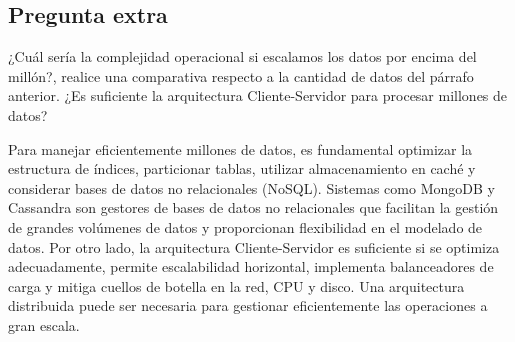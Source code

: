 \subsection{Pregunta extra}
¿Cuál sería la complejidad operacional si escalamos los datos por encima del millón?, realice una comparativa respecto a la cantidad de datos del párrafo anterior. ¿Es suficiente la arquitectura Cliente-Servidor para procesar millones de datos?

Para manejar eficientemente millones de datos, es fundamental optimizar la estructura de índices, particionar tablas, utilizar almacenamiento en caché y considerar bases de datos no relacionales (NoSQL). Sistemas como MongoDB y Cassandra son gestores de bases de datos no relacionales que facilitan la gestión de grandes volúmenes de datos y proporcionan flexibilidad en el modelado de datos. Por otro lado, la arquitectura Cliente-Servidor es suficiente si se optimiza adecuadamente, permite escalabilidad horizontal, implementa balanceadores de carga y mitiga cuellos de botella en la red, CPU y disco. Una arquitectura distribuida puede ser necesaria para gestionar eficientemente las operaciones a gran escala.